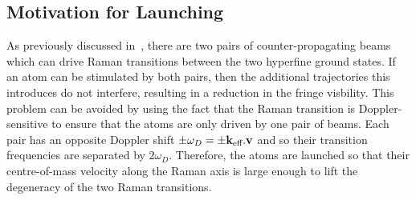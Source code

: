 \subsection{Motivation for Launching}\label{subsec:launching}
As previously discussed in~, there are two pairs of counter-propagating beams which can drive Raman transitions between the two hyperfine ground states. If an atom can be stimulated by both pairs, then the additional trajectories this introduces do not interfere, resulting in a reduction in the fringe visbility. This problem can be avoided by using the fact that the Raman transition is Doppler-sensitive to ensure that the atoms are only driven by one pair of beams. Each pair has an opposite Doppler shift \(\pm \omega_D = \pm {\textbf k_\textnormal{eff}}.\textbf{v}\) and so their transition frequencies are separated by \(2\omega_D\). Therefore, the atoms are launched so that their centre-of-mass velocity along the Raman axis is large enough to lift the degeneracy of the two Raman transitions. 

